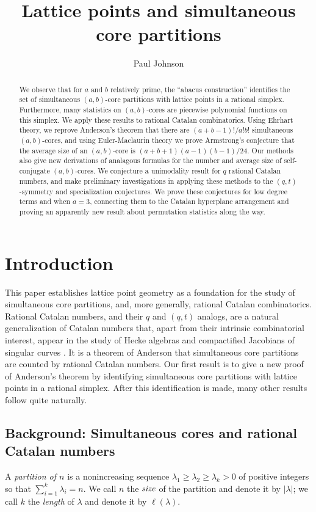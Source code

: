 \documentclass{amsart}[12pt]
\theoremstyle{definition}
\begin{document}
\title{Lattice points and simultaneous core partitions}
\begin{abstract}
We observe that for $a$ and $b$ relatively prime, the ``abacus construction'' identifies the set of simultaneous $(a,b)$-core partitions with lattice points in a rational simplex. Furthermore, many statistics on $(a,b)$-cores are piecewise polynomial functions on this simplex.
We apply these results to rational Catalan combinatorics. Using Ehrhart theory, we reprove Anderson's theorem \cite{anderson} that there are $(a+b-1)!/a!b!$ simultaneous $(a,b)$-cores, and using Euler-Maclaurin theory we prove Armstrong's conjecture \cite{AHJ} that the average size of an $(a,b)$-core is $(a+b+1)(a-1)(b-1)/24$. Our methods also give new derivations of analagous formulas for the number and average size of self-conjugate $(a,b)$-cores.
We conjecture a unimodality result for $q$ rational Catalan numbers, and make preliminary investigations in applying these methods to the $(q,t)$-symmetry and specialization conjectures. We prove these conjectures for low degree terms and when $a=3$, connecting them to the Catalan hyperplane arrangement and proving an apparently new result about permutation statistics along the way.
\end{abstract}
\author{Paul Johnson}
\date{}
\maketitle
\section{Introduction}
This paper establishes lattice point geometry as a foundation for the study of simultaneous core partitions, and, more generally, rational Catalan combinatorics.
Rational Catalan numbers, and their $q$ and $(q,t)$ analogs, are a natural generalization of Catalan numbers that, apart from their intrinsic combinatorial interest, appear in the study of Hecke algebras \cite{GG} and compactified Jacobians of singular curves \cite{EM1, EM2}. It is a theorem of Anderson that simultaneous core partitions are counted by rational Catalan numbers.
Our first result is to give a new proof of Anderson's theorem by identifying simultaneous core partitions with lattice points in a rational simplex. After this identification is made, many other results follow quite naturally.
\subsection{Background: Simultaneous cores and rational Catalan numbers}
A \emph{partition of $n$} is a nonincreasing sequence $\lambda_1\geq \lambda_2\geq
\lambda_{k}> 0$ of positive integers so that $\sum_{i=1}^k \lambda_i=n$. We
call $n$ the $\emph{size}$ of the partition and denote it by $|\lambda|$; we call
$k$ the \emph{length} of $\lambda$ and denote it by $\ell(\lambda)$.
\end{document}
